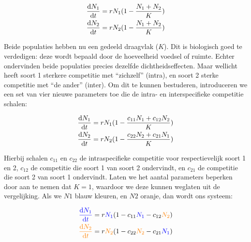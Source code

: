 \documentclass[
  a4paper,
]{scrbook}
\theoremstyle{definition}
\theoremstyle{remark}
\begin{document}
\begin{align*}
\mathchoice{\frac{\mathrm{d}N_1}
{\mathrm{d}t}}{\mathrm{d}N_1/\mathrm{d}t}
{\mathrm{d}N_1/\mathrm{d}t}
{\mathrm{d}N_1/\mathrm{d}t} &= rN_1(1-\frac{N_1+N_2}{K}) \\
\mathchoice{\frac{\mathrm{d}N_2}
{\mathrm{d}t}}{\mathrm{d}N_2/\mathrm{d}t}
{\mathrm{d}N_2/\mathrm{d}t}
{\mathrm{d}N_2/\mathrm{d}t} &= rN_2(1-\frac{N_1+N_2}{K})
\end{align*}

Beide populaties hebben nu een gedeeld draagvlak (\(K\)). Dit is
biologisch goed te verdedigen: deze wordt bepaald door de hoeveelheid
voedsel of ruimte. Echter ondervinden beide populaties precies dezelfde
dichtheidseffecten. Maar wellicht heeft soort 1 sterkere competitie met
``zichzelf'' (intra), en soort 2 sterke competitie met ``de ander''
(inter). Om dit te kunnen bestuderen, introduceren we een set van vier
nieuwe parameters toe die de intra- en interspecifieke competitie
schalen:

\begin{align*}
\mathchoice{\frac{\mathrm{d}N_1}
{\mathrm{d}t}}{\mathrm{d}N_1/\mathrm{d}t}
{\mathrm{d}N_1/\mathrm{d}t}
{\mathrm{d}N_1/\mathrm{d}t} &= rN_1(1-\frac{c_{11}N_1+c_{12}N_2}{K}) \\
\mathchoice{\frac{\mathrm{d}N_2}
{\mathrm{d}t}}{\mathrm{d}N_2/\mathrm{d}t}
{\mathrm{d}N_2/\mathrm{d}t}
{\mathrm{d}N_2/\mathrm{d}t} &= rN_2(1-\frac{c_{22}N_2+c_{21}N_1}{K})
\end{align*}

Hierbij schalen \(c_{11}\) en \(c_{22}\) de intraspecifieke competitie
voor respectievelijk soort 1 en 2, \(c_{12}\) de competitie die soort 1
van soort 2 ondervindt, en \(c_{21}\) de competitie die soort 2 van
soort 1 ondervindt. Laten we het aantal parameters beperken door aan te
nemen dat \(K=1\), waardoor we deze kunnen weglaten uit de vergelijking.
Als we \(N1\) blauw kleuren, en \(N2\) oranje, dan wordt ons systeem:

\begin{align*}
\color{blue} \mathchoice{\frac{\mathrm{d}N_1}
{\mathrm{d}t}}{\mathrm{d}N_1/\mathrm{d}t}
{\mathrm{d}N_1/\mathrm{d}t}
{\mathrm{d}N_1/\mathrm{d}t} &= r\textcolor{blue}{N_1}(1 - c_{11}\textcolor{blue}{N_1} - c_{12}\textcolor{orange}{N_2})\\
\color{orange}\mathchoice{\frac{\mathrm{d}N_2}
{\mathrm{d}t}}{\mathrm{d}N_2/\mathrm{d}t}
{\mathrm{d}N_2/\mathrm{d}t}
{\mathrm{d}N_2/\mathrm{d}t} &= r\textcolor{orange}{N_2}(1 - c_{22}\textcolor{orange}{N_2} - c_{21}\textcolor{blue}{N_1})
\end{align*}
\end{document}
